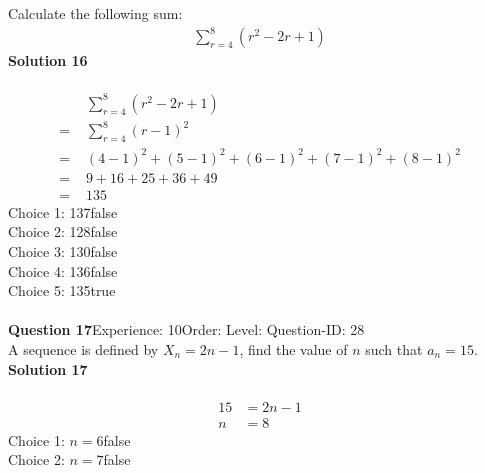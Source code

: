 \documentclass{article}
\begin{document}
Calculate the following sum:
\begin{align*}
\sum_{r=4}^{8} (r^2-2r+1)
\end{align*}
\noindent\textbf{Solution 16}\\[2pt]
\\[-35pt]\begin{align*}
&\sum_{r=4}^{8} (r^2-2r+1)\\[2pt]
=\,\,&\sum_{r=4}^{8} (r-1)^2\\[2pt]
=\,\,&(4-1)^2+(5-1)^2+(6-1)^2+(7-1)^2+(8-1)^2\\[2pt]
=\,\,&9+16+25+36+49\\[2pt]
=\,\,&135
\end{align*}
Choice 1: \hspace{20pt}137\hspace{20pt}false\\
Choice 2: \hspace{20pt}128\hspace{20pt}false\\
Choice 3: \hspace{20pt}130\hspace{20pt}false\\
Choice 4: \hspace{20pt}136\hspace{20pt}false\\
Choice 5: \hspace{20pt}135\hspace{20pt}true\\
\\[4pt]
\noindent\textbf{Question 17}\hspace{20pt}Experience: 10\hspace{20pt}Order: \hspace{20pt}Level: \hspace{20pt}Question-ID: 28\\[2pt]
A sequence is defined by $X_n=2n-1$, find the value of $n$ such that $a_n=15$.\\[4pt]
\noindent\textbf{Solution 17}\\[2pt]
\\[-35pt]\begin{align*}
15&=2n-1\\[2pt]
n&=8
\end{align*}
Choice 1: \hspace{20pt}$n=6$\hspace{20pt}false\\
Choice 2: \hspace{20pt}$n=7$\hspace{20pt}false\\
\end{document}
